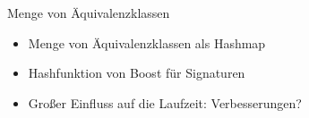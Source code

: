 \begin{frame}{Menge von Äquivalenzklassen}
    \begin{itemize}[<+(1)->]
        \item Menge von Äquivalenzklassen als Hashmap
        \item Hashfunktion von Boost für Signaturen 
        \item Großer Einfluss auf die Laufzeit: Verbesserungen?
    \end{itemize}
\end{frame}
